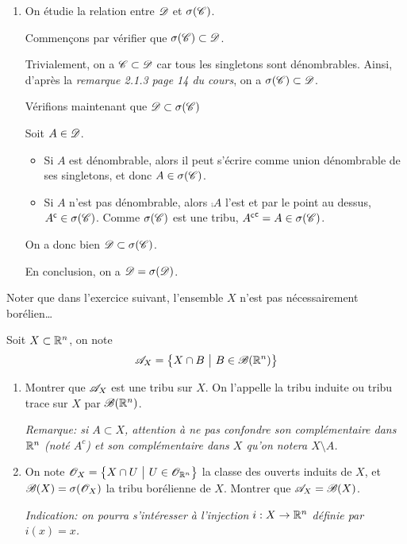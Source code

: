 {\begin{td-sol}[]
\begin{enumerate}
                \item On étudie la relation entre \(\mathscr{D}\) et \(\sigma(\mathscr{C})\).

                Commençons par vérifier que \(\sigma(\mathscr{C})\subset\mathscr{D}\).
                
                Trivialement, on a \(\mathscr{C}\subset\mathscr{D}\) car tous les singletons sont dénombrables. Ainsi, d'après 
                la \textit{remarque 2.1.3 page 14 du cours}, on a \(\sigma(\mathscr{C})\subset\mathscr{D}\).

                Vérifions maintenant que \(\mathscr{D} \subset\sigma(\mathscr{C})\)

                Soit \(A\in \mathscr{D}\).

                \begin{itemize}
                    \item Si \(A\) est dénombrable, alors il peut s'écrire comme union dénombrable de ses singletons, et donc \(A\in\sigma(\mathscr{C})\).

                    \item Si \(A\) n'est pas dénombrable, alors \(\comp A\) l'est et par le point au dessus, \({A}^{\mathsf{c}}\in\sigma(\mathscr{C})\).
                    Comme \(\sigma(\mathscr{C})\) est une tribu, \({{A}^{\mathsf{c}}}^{\mathsf{c}}=A\in\sigma(\mathscr{C})\).
                \end{itemize}
                On a donc bien \(\mathscr{D}\subset\sigma(\mathscr{C})\).

                En conclusion, on a \(\mathscr{D}=\sigma(\mathscr{D})\).
            \end{enumerate}
    \end{td-sol}
}{}

%
\begin{remark}
    Noter que dans l'exercice suivant, l'ensemble \(X\) n'est pas nécessairement borélien\ldots
\end{remark}

\begin{td-exo}
    Soit \(X\subset \mathbb{R}^n\), on note
    \[
    \mathscr{A}_X=\big\{X\cap B\ \big|\ B\in\mathscr{B}(\mathbb{R}^n)\big\}
    \]
    \begin{enumerate}
        \item Montrer que \(\mathscr{A}_X\) est une tribu sur \(X\). On l'appelle la tribu induite ou tribu trace sur \(X\) par \(\mathscr{B}(\mathbb{R}^n)\).
        
        \textit{Remarque: si \(A\subset X\), attention à ne pas confondre son complémentaire dans \(\mathbb{R}^n\) (noté \(A^c\)) et son complémentaire dans \(X\) qu'on notera \(X\setminus A\).}
        
        \item On note \(\scr O_X=\big\{X\cap U\ \big|\ U\in\scr O_{\bb R^n}\big\}\) la classe des ouverts induits de \(X\), et \(\mathscr{B}(X)=\sigma(\mathscr{O}_X)\) la tribu borélienne de \(X\). Montrer que \(\mathscr{A}_X=\mathscr{B}(X)\).
        
        \textit{Indication: on pourra s'intéresser à l'injection \(i:X\to \mathbb{R}^n\) définie par \(i(x)=x\).}
    \end{enumerate}
\end{td-exo}

